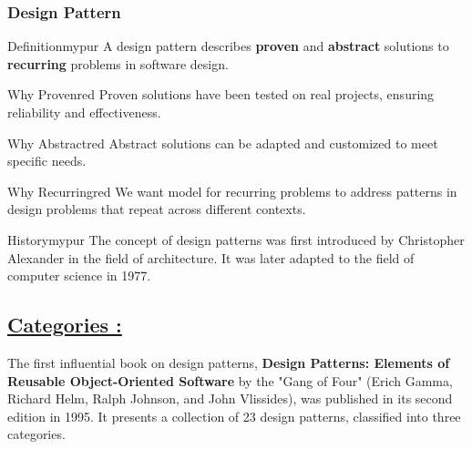 \subsubsection{Design Pattern}

\begin{prettyBox}{Definition}{mypur}
A design pattern describes \textbf{proven} and \textbf{abstract} solutions  
to \textbf{recurring} problems in software design.
\end{prettyBox}


\vspace{0.25cm}
\begin{prettyBox}{Why Proven}{red}
Proven solutions have been tested on real projects, ensuring reliability and effectiveness.
\end{prettyBox}

\vspace{0.25cm}
\begin{prettyBox}{Why Abstract}{red}
Abstract solutions can be adapted and customized to meet specific needs.
\end{prettyBox}

\vspace{0.25cm}
\begin{prettyBox}{Why Recurring}{red}
We want model for recurring problems to address patterns in design problems that repeat across different contexts.
\end{prettyBox}

\vspace{0.25cm}

\begin{prettyBox}{History}{mypur}
The concept of design patterns was first introduced by Christopher Alexander
in the field of architecture. It was later adapted to the field of computer
science in 1977.
\end{prettyBox}

\vspace{0.25cm}
\subsection*{\underline{Categories :}}
The first influential book on design patterns, \textbf{Design Patterns: Elements of Reusable
Object-Oriented Software} by the "Gang of Four" (Erich Gamma, Richard Helm,
Ralph Johnson, and John Vlissides), was published in its second edition in 1995.
It presents a collection of 23 design patterns, classified into three categories.


\vspace{0.75cm}

